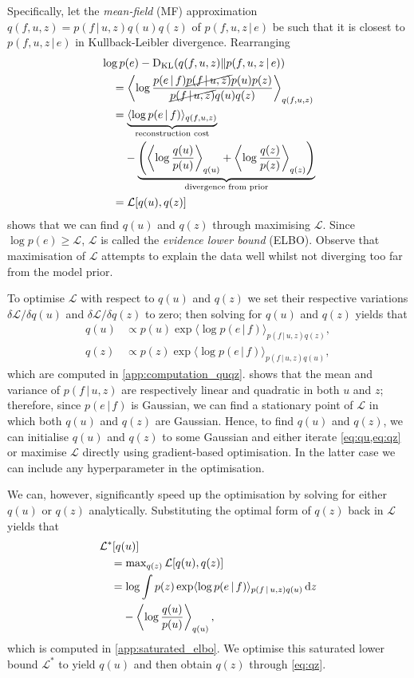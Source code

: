 \documentclass{article}
\renewcommand{\max}{\operatorname{max}}
\newcommand{\KL}{\operatorname{D}_{\text{KL}}}
\newcommand{\id}[1]{\, \mathrm{d} #1}     %
\newcommand{\cond}{\, | \,}               %
\renewcommand{\ll}{\left}
\newcommand{\rr}{\right}
\newcommand{\la}{\langle}
\newcommand{\ra}{\rangle}
\newcommand{\phan}[1]{\hphantom{#1\;}}
\begin{document}
Specifically, let the \textit{mean-field} (MF) approximation $q(f,u,z)=p(f\cond u, z)q(u)q(z)$ of $p(f,u,z\cond e)$ be such that it is closest to $p(f,u,z\cond e)$ in Kullback-Leibler divergence. Rearranging
\begin{align*}
    &\log p(e) - \KL(q(f,u,z)\|p(f,u,z\cond e)) \\
    &\quad= \ll\la \log \frac{p(e\cond f)\cancel{p(f\cond u, z)}p(u)p(z)}{\cancel{p(f\cond u, z)}q(u)q(z)} \rr\ra_{q(f,u,z)} \\
    &\quad= \underbrace{\la \log p(e\cond f) \ra_{q(f,u,z)}}_{\text{reconstruction cost}} \\
    &\quad\phan{=}- \underbrace{\ll(\ll\la\log\frac{q(u)}{p(u)}\rr\ra_{q(u)} + \ll\la\log\frac{q(z)}{p(z)}\rr\ra_{q(z)}\rr)}_{\text{divergence from prior}} \\
    &\quad=\mathcal{L}[q(u),q(z)]
\end{align*}
shows that we can find $q(u)$ and $q(z)$ through maximising $\mathcal{L}$. Since $\log p(e)\ge\mathcal{L}$, $\mathcal{L}$ is called the \textit{evidence lower bound} (ELBO). Observe that maximisation of $\mathcal{L}$ attempts to explain the data well whilst not diverging too far from the model prior.

To optimise $\mathcal{L}$ with respect to $q(u)$ and $q(z)$ we set their respective variations $\delta \mathcal{L} / \delta q(u)$ and $\delta \mathcal{L} / \delta q(z)$ to zero; then solving for $q(u)$ and $q(z)$ yields that
\begin{align}
    q(u) &\propto p(u) \exp \la \log p(e\cond f) \ra_{p(f\cond u,z)q(z)}, \label{eq:qu} \\
    q(z) &\propto p(z) \exp \la \log p(e\cond f) \ra_{p(f\cond u,z)q(u)}, \label{eq:qz}
\end{align}
which are computed in \cref{app:computation_quqz}.
 shows that the mean and variance of $p(f\cond u, z)$ are respectively linear and quadratic in both $u$ and $z$; therefore, since $p(e\cond f)$ is Gaussian, we can find a stationary point of $\mathcal{L}$ in which both $q(u)$ and $q(z)$ are Gaussian. Hence, to find $q(u)$ and $q(z)$, we can initialise $q(u)$ and $q(z)$ to some Gaussian and either iterate \cref{eq:qu,eq:qz} or maximise $\mathcal{L}$ directly using gradient-based optimisation. In the latter case we can include any hyperparameter in the optimisation.

We can, however, significantly speed up the optimisation by solving for either $q(u)$ or $q(z)$ analytically. Substituting the optimal form of $q(z)$ back in $\mathcal{L}$ yields that
\begin{align}
    &\mathcal{L}^*[q(u)] \nonumber\\
    &\quad=\max_{q(z)} \mathcal{L}[q(u),q(z)]\nonumber\\
    &\quad= \log \int p(z)\exp \la \log p(e\cond f) \ra_{p(f\cond u, z)q(u)} \id{z} \nonumber\\
    &\quad\phan{=}-\ll\la\log\frac{q(u)}{p(u)}\rr\ra_{q(u)},\label{eq:saturated_elbo}
\end{align}
which is computed in \cref{app:saturated_elbo}. We optimise this saturated lower bound $\mathcal{L}^*$ to yield $q(u)$ and then obtain $q(z)$ through \cref{eq:qz}.
\end{document}
